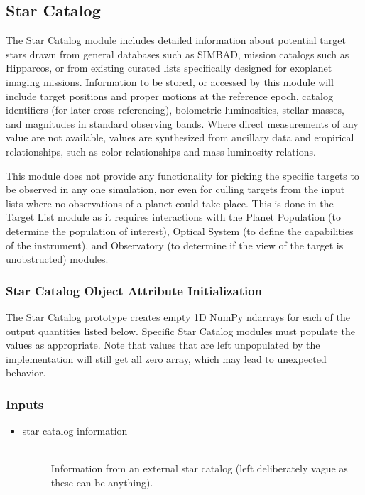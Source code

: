 \documentclass[cleanfoot]{asme2ej}
\begin{document}
\subsection{Star Catalog} \label{sec:starcatalog}
The Star Catalog module includes detailed information about potential target stars drawn from general databases such as SIMBAD, mission catalogs such as Hipparcos, or from existing curated lists specifically designed for exoplanet imaging missions.  Information to be stored, or accessed by this module will include target positions and proper motions at the reference epoch, catalog identifiers (for later cross-referencing), bolometric luminosities, stellar masses, and magnitudes in standard observing bands.  Where direct measurements of any value are not available, values are synthesized from ancillary data and empirical relationships, such as color relationships and mass-luminosity relations.

This module does not provide any functionality for picking the specific targets to be observed in any one simulation, nor even for culling targets from the input lists where no observations of a planet could take place.  This is done in the Target List module as it requires interactions with the Planet Population (to determine the population of interest), Optical System (to define the capabilities of the instrument), and Observatory (to determine if the view of the target is unobstructed) modules.

\subsubsection{Star Catalog Object Attribute Initialization} 
The Star Catalog prototype creates empty 1D NumPy ndarrays for each of the output quantities listed below.  Specific Star Catalog modules must populate the values as appropriate.  Note that values that are left unpopulated by the implementation will still get all zero array, which may lead to unexpected behavior.

\subsubsection*{Inputs}
\begin{itemize}
    \item 
    \begin{description}
        \item[star catalog information] \hfill \\
        Information from an external star catalog (left deliberately vague as these can be anything).
    \end{description}
\end{itemize}
\end{document}
